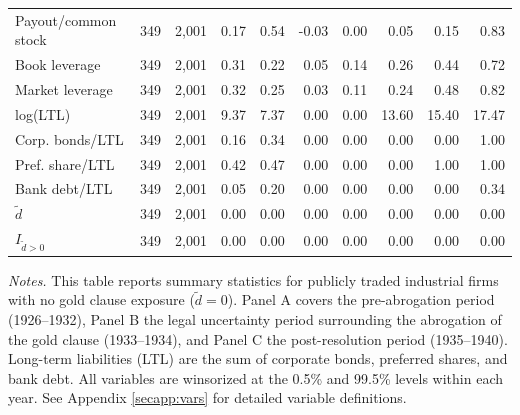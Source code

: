 \begin{table}[p]
\begin{threeparttable}
\begin{tabular}{lrrrrrrrrr}
            Payout/common stock & 349 & 2,001 & 0.17 & 0.54 & -0.03 & 0.00 & 0.05 & 0.15 & 0.83 \\
            Book leverage & 349 & 2,001 & 0.31 & 0.22 & 0.05 & 0.14 & 0.26 & 0.44 & 0.72 \\
            Market leverage & 349 & 2,001 & 0.32 & 0.25 & 0.03 & 0.11 & 0.24 & 0.48 & 0.82 \\
            log(LTL) & 349 & 2,001 & 9.37 & 7.37 & 0.00 & 0.00 & 13.60 & 15.40 & 17.47 \\
            Corp. bonds/LTL & 349 & 2,001 & 0.16 & 0.34 & 0.00 & 0.00 & 0.00 & 0.00 & 1.00 \\
            Pref. share/LTL & 349 & 2,001 & 0.42 & 0.47 & 0.00 & 0.00 & 0.00 & 1.00 & 1.00 \\
            Bank debt/LTL & 349 & 2,001 & 0.05 & 0.20 & 0.00 & 0.00 & 0.00 & 0.00 & 0.34 \\
            \ensuremath{\tilde{d}} & 349 & 2,001 & 0.00 & 0.00 & 0.00 & 0.00 & 0.00 & 0.00 & 0.00 \\
            \ensuremath{I_{\tilde{d}>0}} & 349 & 2,001 & 0.00 & 0.00 & 0.00 & 0.00 & 0.00 & 0.00 & 0.00 \\
            \bottomrule
        \end{tabular}
    \end{threeparttable}

    \vspace*{3mm} \justifying \noindent
    \scriptsize{\textit{Notes.} This table reports summary statistics for publicly traded industrial firms with no gold clause exposure ($\tilde{d} = 0$). Panel A covers the pre-abrogation period (1926--1932), Panel B the legal uncertainty period surrounding the abrogation of the gold clause (1933--1934), and Panel C the post-resolution period (1935--1940). Long-term liabilities (LTL) are the sum of corporate bonds, preferred shares, and bank debt. All variables are winsorized at the 0.5\% and 99.5\% levels within each year. See Appendix \ref{secapp:vars} for detailed variable definitions.}
\end{table}